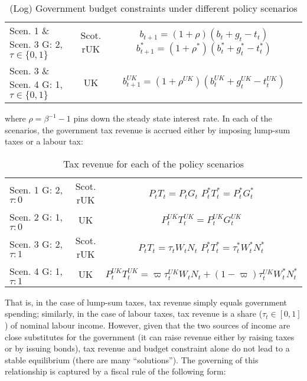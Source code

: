 \begin{table}[H]
    \renewcommand{\arraystretch}{2}
    \centering
    \begin{tabular}{l|c|c}
    \makecell{Scen. 1 \& Scen. 3\\ G: 2, $\tau \in \{0, 1\}$} & \makecell{Scot. \\ rUK } & 
        \makecell{
            $b_{t+1} = (1 + \rho)(b_t + g_t - t_t)$\\
            $b^*_{t+1} = (1 + \rho^*)(b^*_t + g^*_t - t^*_t)$
        }  \\ 
    \makecell{Scen. 3 \& Scen. 4\\ G: 1, $\tau \in \{0, 1\}$} & UK & 
    $b^{UK}_{t+1} = (1 + \rho^{UK})(b^{UK}_t + g^{UK}_t - t^{UK}_t)$
    \end{tabular}
    \caption{(Log) Government budget constraints under different policy scenarios}
\end{table}
where $\rho = \beta^{-1} - 1$ pins down the steady state interest rate. In each of the scenarios, the government tax revenue is accrued either by imposing lump-sum taxes or a labour tax:
\begin{table}[H]
    \renewcommand{\arraystretch}{2}
    \centering
    \begin{tabular}{l|c|c}
    \makecell{Scen. 1 \\ G: 2, $\tau: 0$} & \makecell{Scot. \\ rUK } & 
        \makecell{
            $P_t T_t = P_tG_t$\\
            $ P^*_tT^*_t = P^*_tG^*_t $
        }  \\ 
    \makecell{Scen. 2 \\ G: 1, $\tau: 0$} & UK & 
    $P^{UK}_tT^{UK}_t = P^{UK}_tG^{UK}_t$\\
    \makecell{Scen. 3 \\ G: 2, $\tau: 1$} & \makecell{Scot. \\ rUK } & 
    \makecell{
        $P_tT_t = \tau_tW_t N_t$\\ 
        $P^*_tT^*_t = \tau^*_tW^*_t N^*_t$
    }  \\
    \makecell{Scen. 4 \\ G: 1, $\tau: 1$} & UK & 
    $P^{UK}_tT^{UK}_t = \varpi\tau^{UK}_tW_t N_t + (1-\varpi)\tau^{UK}_tW^*_t N^*_t$
    \end{tabular}
    \caption{Tax revenue for each of the policy scenarios}
\end{table}
That is, in the case of lump-sum taxes, tax revenue simply equals government spending; similarly, in the case of labour taxes, tax revenue is a share ($ \tau_t \in [0,1]$) of nominal labour income. However, given that the two sources of income are close substitutes for the government (it can raise revenue either by raising taxes or by issuing bonds), tax revenue and budget constraint alone do not lead to a stable equilibrium (there are many ``solutions''). The governing of this relationship is captured by a fiscal rule of the following form:
